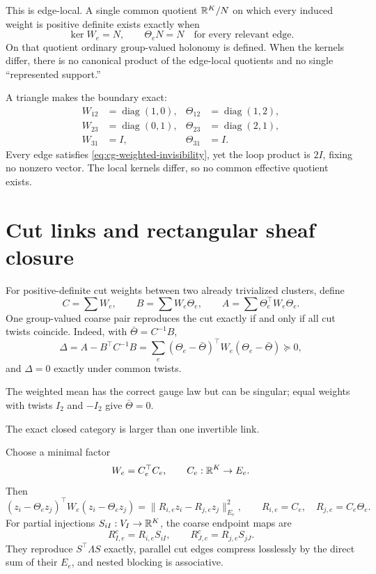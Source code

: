 This is edge-local. A single common quotient
\(\mathbb R^K/N\) on which every induced weight is positive definite exists exactly
when
\begin{equation}
\ker W_e=N,\qquad \Theta_eN=N
\quad\text{for every relevant edge}.
\label{eq:cg-common-quotient}
\end{equation}
On that quotient ordinary group-valued holonomy is defined. When the kernels
differ, there is no canonical product of the edge-local quotients and no
single ``represented support.'' 

A triangle makes the boundary exact:
\[
\begin{aligned}
W_{12}&=\operatorname{diag}(1,0),&
\Theta_{12}&=\operatorname{diag}(1,2),\\
W_{23}&=\operatorname{diag}(0,1),&
\Theta_{23}&=\operatorname{diag}(2,1),\\
W_{31}&=I,&\Theta_{31}&=I.
\end{aligned}
\]
Every edge satisfies \eqref{eq:cg-weighted-invisibility}, yet the loop product
is \(2I\), fixing no nonzero vector. The local kernels differ, so no common
effective quotient exists. 

\section{Cut links and rectangular sheaf closure}
\label{sec:cg-sheaf-closure}

For positive-definite cut weights between two already trivialized clusters,
define
\[
C=\sum W_e,\qquad B=\sum W_e\Theta_e,\qquad
A=\sum\Theta_e^\top W_e\Theta_e.
\]
One group-valued coarse pair reproduces the cut exactly if and only if all
cut twists coincide. Indeed, with \(\bar\Theta=C^{-1}B\),
\begin{equation}
\Delta=A-B^\top C^{-1}B
=\sum_e(\Theta_e-\bar\Theta)^\top W_e
(\Theta_e-\bar\Theta)\succeq0,
\label{eq:cg-cut-excess}
\end{equation}
and \(\Delta=0\) exactly under common twists. 

The weighted mean has the correct gauge law but can be singular; equal weights
with twists \(I_2\) and \(-I_2\) give \(\bar\Theta=0\).

The exact closed category is larger than one invertible link.

Choose a minimal factor
\[
W_e=C_e^\top C_e,\qquad C_e:\mathbb R^K\to E_e .
\]
Then
\begin{equation}
(z_i-\Theta_ez_j)^\top W_e(z_i-\Theta_ez_j)
=\|R_{i,e}z_i-R_{j,e}z_j\|_{E_e}^2,
\qquad
R_{i,e}=C_e,\quad R_{j,e}=C_e\Theta_e.
\label{eq:cg-sheaf-factor}
\end{equation}
For partial injections \(S_{iI}:V_I\to\mathbb R^K\), the coarse endpoint maps are
\begin{equation}
R^c_{I,e}=R_{i,e}S_{iI},\qquad
R^c_{J,e}=R_{j,e}S_{jJ}.
\label{eq:cg-sheaf-coarse-maps}
\end{equation}
They reproduce \(S^\top\Lambda S\) exactly, parallel cut edges compress
losslessly by the direct sum of their \(E_e\), and nested blocking is
associative. 

